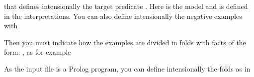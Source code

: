 \documentclass[letterpaper,10pt,english]{sphinxmanual}
\begin{document}
\begin{sphinxVerbatim}[commandchars=\\\{\}]
   
\end{sphinxVerbatim}

that defines intensionally the target predicate . Here  is the model and  is defined in the interpretations.
You can also define intensionally the negative examples with

\begin{sphinxVerbatim}[commandchars=\\\{\}]
 
 
\end{sphinxVerbatim}

Then you must indicate how the examples are divided in folds with facts of the form: , as for example

\begin{sphinxVerbatim}[commandchars=\\\{\}]
\PYG{p}{[}\PYG{p}{]}
\PYG{p}{[}\PYG{p}{]}
\end{sphinxVerbatim}

As the input file is a Prolog program, you can define intensionally the folds as in

\begin{sphinxVerbatim}[commandchars=\\\{\}]
\end{sphinxVerbatim}
\end{document}

